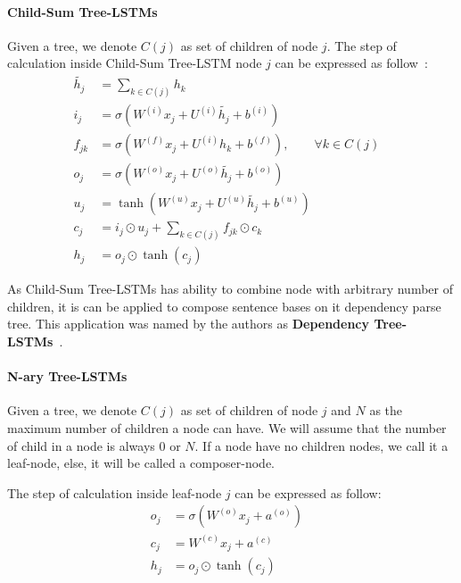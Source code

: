 \paragraph{Child-Sum Tree-LSTMs}
Given a tree, we denote \(C(j)\) as set of children of node \(j\).
The step of calculation inside Child-Sum Tree-LSTM node \(j\) can be expressed as follow~\cite{treeLSTM}:
\begin{align}
  	\tilde{h_j} &= \sum_{k \in C(j)} h_k &\label{eq1:2}\\
  	i_j &= \sigma{(W^{(i)}x_j + U^{(i)}\tilde{h_j} + b^{(i)})} &\label{eq1:3}\\
  	f_{jk} &= \sigma{(W^{(f)}x_j + U^{(i)}h_k + b^{(f)})}, \qquad  \forall k \in C(j) & \label{eq1:foget1}\\
  	o_j &= \sigma{(W^{(o)}x_j + U^{(o)}\tilde{h_j} + b^{(o)})} &\label{eq1:5}\\
  	u_j &= \tanh{(W^{(u)}x_j + U^{(u)}\tilde{h_j} + b^{(u)})} &\label{eq1:6}\\
   	c_j &= i_j \odot u_j + \sum_{k \in C(j)} f_{jk} \odot c_k & \\
	h_j &= o_j \odot \tanh{(c_j)} &
\end{align}

As Child-Sum Tree-LSTMs has ability to combine node with arbitrary number of children, it is can be applied to compose sentence bases on it dependency parse tree.
This application was named by the authors as \textbf{Dependency Tree-LSTMs}~\cite{treeLSTM}.

\paragraph{N-ary Tree-LSTMs}
Given a tree, we denote \(C(j)\) as set of children of node \(j\) and \(N\) as the maximum number of children a node can have. 
We will assume that the number of child in a node is always \(0\) or \(N\). 
If a node have no children nodes, we call it a leaf-node, else, it will be called a composer-node. 

The step of calculation inside leaf-node \(j\) can be expressed as follow:
\begin{align}
	o_j &= \sigma{\left( W^{(o)} x_j + a^{\left(o\right)}\right)} & \\
   	c_j &= W^{(c)} x_j + a^{(c)} & \\
	h_j &= o_j \odot \tanh{\left(c_j\right)} &
\end{align}

